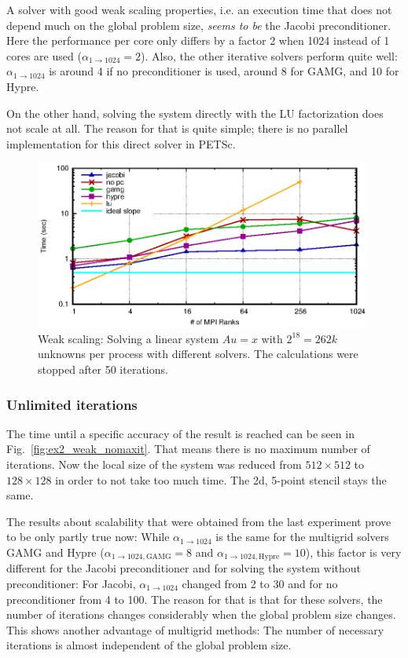 A solver with good weak scaling properties, i.e. an execution time that does not depend much on the global problem size, \textit{seems to be} the Jacobi preconditioner. Here the performance per core only differs by a factor 2 when 1024 instead of 1 cores are used ($\alpha_{1 \rightarrow 1024} = 2$). Also, the other iterative solvers perform quite well:  $\alpha_{1 \rightarrow 1024}$ is around 4 if no preconditioner is used, around 8 for GAMG, and 10 for Hypre. 

On the other hand, solving the system directly with the LU factorization does not scale at all. The reason for that is quite simple; there is no parallel implementation for this direct solver in PETSc.

\begin{figure}[tb]
	\centering
	\includegraphics[width=0.99\textwidth]{ex2_weak_time}
	\caption{Weak scaling: Solving a linear system $Au = x$ with $2^{18} = 262k$ unknowns per process with different solvers. The calculations were stopped after 50 iterations.} 
	\label{fig:ex2_weak_time}
\end{figure}

\subsubsection*{Unlimited iterations}
The time until a specific accuracy of the result is reached can be seen in Fig.~\ref{fig:ex2_weak_nomaxit}. That means there is no maximum number of iterations. Now the local size of the system was reduced from $512\times 512$ to $128\times 128$ in order to not take too much time. The 2d, 5-point stencil stays the same.

The results about scalability that were obtained from the last experiment prove to be only partly true now: While $\alpha_{1 \rightarrow 1024}$ is the same for the multigrid solvers GAMG and Hypre ($\alpha_{1 \rightarrow 1024, \textrm{GAMG}} =8$ and $\alpha_{1 \rightarrow 1024, \textrm{Hypre}} =10$), this factor is very different for the Jacobi preconditioner and for solving the system without preconditioner: For Jacobi, $\alpha_{1 \rightarrow 1024}$ changed from 2 to 30 and for no preconditioner from 4 to 100. The reason for that is that for these solvers, the number of iterations changes considerably when the global problem size changes. This shows another advantage of multigrid methods: The number of necessary iterations is almost independent of the global problem size.

